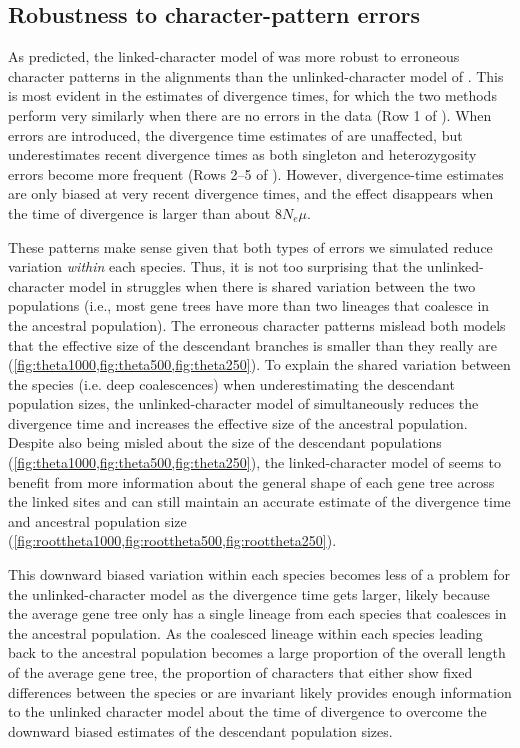 \subsection{Robustness to character-pattern errors}
As predicted, the linked-character model of \beast was more robust to erroneous
character patterns in the alignments than the unlinked-character model of
\ecoevolity.
This is most evident in the estimates of divergence times, for which
the two methods perform very similarly when there are no errors in the
data (Row 1 of \timefigs).
When errors are introduced, the divergence time estimates of \beast are
unaffected, but \ecoevolity underestimates recent divergence times as both
singleton and heterozygosity errors become more frequent (Rows 2--5 of
\timefigs).
However, \ecoevolity divergence-time estimates are only biased at
very recent divergence times, and the effect disappears
when the time of divergence is larger than about $8N_e\mu$.

These patterns make sense given that both types of errors we simulated
reduce variation \emph{within} each species.
Thus, it is not too surprising that the unlinked-character model in \ecoevolity
struggles when there is shared variation between
the two populations (i.e., most gene trees have more than
two lineages that coalesce in the ancestral population).
The erroneous character patterns mislead both models that the effective size of
the descendant branches is smaller than they really are
(\cref{fig:theta1000,fig:theta500,fig:theta250}).
To explain the shared variation between the species (i.e. deep coalescences)
when underestimating the descendant population sizes,
the unlinked-character model of \ecoevolity
simultaneously reduces the divergence time and increases the effective
size of the ancestral population.
Despite also being misled about the size of the descendant populations
(\cref{fig:theta1000,fig:theta500,fig:theta250}),
the linked-character model of \beast seems to benefit from more information
about the general shape of each gene tree across the linked sites and can still
maintain an accurate estimate of the divergence time
\timefigsp
and ancestral population size
(\cref{fig:roottheta1000,fig:roottheta500,fig:roottheta250}).

This downward biased variation within each species becomes
less of a problem for the unlinked-character model as the
divergence time gets larger, likely because the average gene
tree only has a single lineage from each species that coalesces
in the ancestral population.
As the coalesced lineage within each species leading back to the ancestral
population becomes a large proportion of the overall length of the average gene
tree, the proportion of characters that either show fixed differences between
the species or are invariant likely provides enough information to the unlinked
character model about the time of divergence to overcome the downward biased
estimates of the descendant population sizes.


